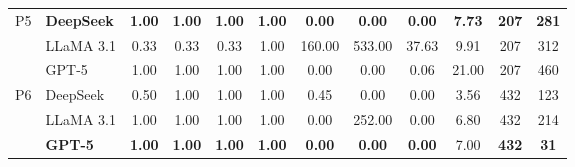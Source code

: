 \documentclass[review,12pt]{elsarticle}
\begin{document}
\begin{table}[htbp]
\begin{adjustbox}{max width=\textwidth}
\begin{tabular}{c l c c c c c c c c c c}
\midrule
P5 & \textbf{DeepSeek} & \textbf{1.00} & \textbf{1.00} & \textbf{1.00} & \textbf{1.00} & \textbf{0.00} & \textbf{0.00} & \textbf{0.00} & \textbf{7.73} & \textbf{207} & \textbf{281} \\[-4pt]
   & LLaMA 3.1 & 0.33 & 0.33 & 0.33 & 1.00 & 160.00 & 533.00 & 37.63 & 9.91 & 207 & 312 \\[-4pt]
   & GPT-5 & 1.00 & 1.00 & 1.00 & 1.00 & 0.00 & 0.00 & 0.06 & 21.00 & 207 & 460 \\
\midrule
P6 & DeepSeek & 0.50 & 1.00 & 1.00 & 1.00 & 0.45 & 0.00 & 0.00 & 3.56 & 432 & 123 \\[-4pt]
   & LLaMA 3.1 & 1.00 & 1.00 & 1.00 & 1.00 & 0.00 & 252.00 & 0.00 & 6.80 & 432 & 214 \\[-4pt]
   & \textbf{GPT-5} & \textbf{1.00} & \textbf{1.00} & \textbf{1.00} & \textbf{1.00} & \textbf{0.00} & \textbf{0.00} & \textbf{0.00} & 7.00 & \textbf{432} & \textbf{31} \\
\bottomrule
\end{tabular}
\end{adjustbox}
\end{table}
\end{document}
